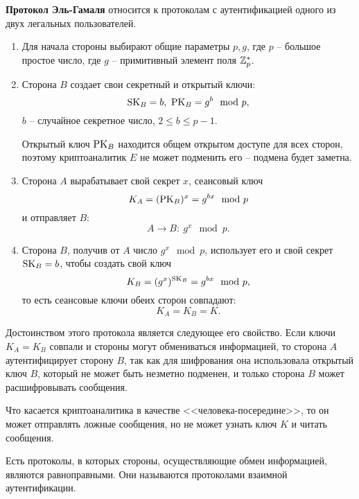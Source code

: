 \textbf{Протокол Эль-Гамаля} относится к протоколам с аутентификацией одного из двух легальных пользователей.
\begin{enumerate}
    \item Для начала стороны выбирают общие параметры $p, g$, где $p$ -- большое простое число, где $g$ -- примитивный элемент поля $\mathbb{Z}_p^*$.
    \item Сторона $B$ создает свои секретный и открытый ключи:
            \[ \textrm{SK}_B = b, ~ \textrm{PK}_B = g^b \mod p, \]
        $b$ -- случайное секретное число, $2 \leq b \leq p-1$.

        Открытый ключ $\textrm{PK}_B$ находится общем открытом доступе для всех сторон, поэтому криптоаналитик $E$ не может подменить его -- подмена будет заметна.
    \item Сторона $A$ вырабатывает свой секрет $x$, сеансовый ключ
            \[ K_A = (\textrm{PK}_B)^x = g^{bx} \mod p \]
        и отправляет $B$:
            \[ A \rightarrow B: ~ g^x \mod p. \]
    \item Сторона $B$, получив от $A$ число $g^x \mod p$, использует его и свой секрет $\textrm{SK}_B = b$, чтобы создать свой ключ
            \[ K_B = (g^x)^{\textrm{SK}_B} = g^{bx} \mod p, \]
        то есть сеансовые ключи обеих сторон совпадают:
            \[ K_A = K_B = K. \]
\end{enumerate}

Достоинством этого протокола является следующее его свойство. Если ключи $K_A = K_B$ совпали и стороны могут обмениваться информацией, то сторона $A$ аутентифицирует сторону $B$, так как для шифрования она использовала открытый ключ $B$, который не может быть незметно подменен, и только сторона $B$ может расшифровывать сообщения.

Что касается криптоаналитика в качестве <<человека-посередине>>, то он может отправлять ложные сообщения, но не может узнать ключ $K$ и читать сообщения.

Есть протоколы, в которых стороны, осуществляющие обмен информацией, являются равноправными. Они называются протоколами взаимной аутентификации.
